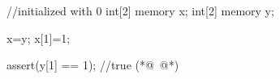 \begin{soliditybox}
//initialized with 0
int[2] memory x;
int[2] memory y;

x=y;
x[1]=1;

assert(y[1] == 1); //true
(*@~@*)
\end{soliditybox}